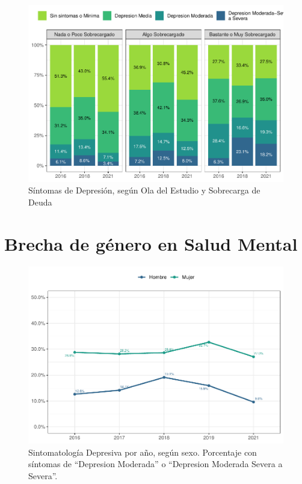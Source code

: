 \documentclass[
  12pt,
]{book}
\begin{document}
\begin{figure}

{\centering \includegraphics{reporte-elsoc_files/figure-latex/depre-deuda-wave-1} 

}

\caption{Síntomas de Depresión, según Ola del Estudio y Sobrecarga de Deuda}\label{fig:depre-deuda-wave}
\end{figure}

\hypertarget{brecha-de-guxe9nero-en-salud-mental}{%
\section{Brecha de género en Salud Mental}\label{brecha-de-guxe9nero-en-salud-mental}}

\begin{figure}

{\centering \includegraphics{reporte-elsoc_files/figure-latex/depre-year-sexo-1} 

}

\caption{Sintomatología Depresiva por año, según sexo. Porcentaje con síntomas de “Depresion Moderada” o “Depresion Moderada Severa a Severa”.}\label{fig:depre-year-sexo}
\end{figure}
\end{document}
